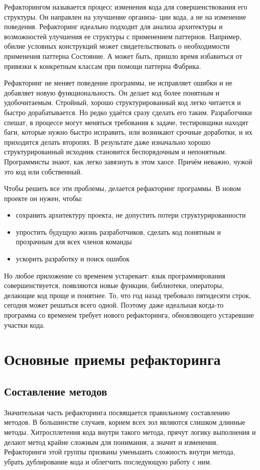 Рефакторингом называется процесс изменения кода для совершенствования его структуры. Он направлен на улучшение организа-
ции кода, а не на изменение поведения. Рефакторинг идеально подходит для анализа архитектуры и возможностей улучшения ее структуры с применением паттернов. Например, обилие условных конструкций может свидетельствовать о необходимости
применения паттерна Состояние. А может быть, пришло время избавиться от привязки к конкретным классам при помощи паттерна Фабрика.

Рефакторинг не меняет поведение программы, не исправляет ошибки и не добавляет новую функциональность. Он делает код более понятным и удобочитаемым.
Стройный, хорошо структурированный код легко читается и быстро дорабатывается. Но редко удаётся сразу сделать его таким. Разработчики спешат, в процессе могут меняться требования к задаче, тестировщики находят баги, которые нужно быстро исправить, или возникают срочные доработки, и их приходится делать второпях.
\newpage
В результате даже изначально хорошо структурированный исходник становится беспорядочным и непонятным. Программисты знают, как легко завязнуть в этом хаосе. Причём неважно, чужой это код или собственный.

Чтобы решить все эти проблемы, делается рефакторинг программы. В новом проекте он нужен, чтобы:

    \begin{itemize}%
    \item сохранить архитектуру проекта, не допустить потери структурированности
    \item упростить будущую жизнь разработчиков, сделать код понятным и прозрачным для всех членов команды
    \item ускорить разработку и поиск ошибок
    \end{itemize}

Но любое приложение со временем устаревает: язык программирования совершенствуется, появляются новые функции, библиотеки, операторы, делающие код проще и понятнее. То, что год назад требовало пятидесяти строк, сегодня может решаться всего одной. Поэтому даже идеальная когда-то программа со временем требует нового рефакторинга, обновляющего устаревшие участки кода.
\newpage

\section{Основные приемы рефакторинга}

\subsection{Составление методов}
Значительная часть рефакторинга посвящается правильному составлению методов. В большинстве случаев, корнем всех зол являются слишком длинные методы. Хитросплетения кода внутри такого метода, прячут логику выполнения и делают метод крайне сложным для понимания, а значит и изменения. Рефакторинги этой группы призваны уменьшить сложность внутри метода, убрать дублирование кода и облегчить последующую работу с ним.

